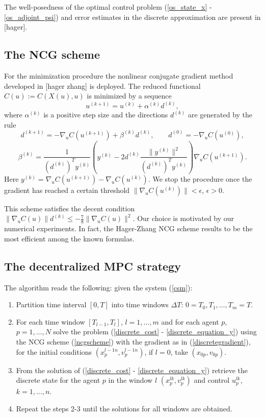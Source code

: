 \documentclass[a4paper,10pt, english]{article}
\begin{document}
 The well-posedness of the optimal control problem (\ref{os_state_x} - \ref{os_adjoint_psi}) and error estimates in the discrete approximation are present in [hager].
 


 \subsection{The NCG scheme}
  For the minimization procedure the nonlinear conjugate gradient  method developed in [hager zhang] is deployed.
  The reduced functional $C(u):=C(X(u), u)$ is minimized by a sequence
  \begin{equation}
  u^{(k+1)} =   u^{(k)} + \alpha^{(k)} d^{(k)},
  \label{ncgscheme}
   \end{equation}  
  where $\alpha^{(k)}$ is a positive step size and the directions $d^{(k)}$ are generated by the rule
  \begin{equation}
  d^{(k+1)} = - \nabla_u C(u^{(k+1)}) + \beta^{(k)} d^{(k)}, \qquad d^{(0)} = -\nabla_u C(u^{(0)}),
  \label{drct}
  \end{equation}
  \begin{equation}
  \beta^{(k)} = \frac{1}{(d^{(k)})^T y^{(k)}} \left( y^{(k)} - 2d^{(k)}\frac{\|y^{(k)}\|^2}{(d^{(k)})^T y^{(k)}}\right)\nabla_u C(u^{(k+1)}).
  \label{drct}
  \end{equation}  
  Here $y^{(k)} = \nabla_u C(u^{(k+1)}) - \nabla_u C(u^{(k)})$. 
  We stop the procedure once the gradient has reached a certain threshold $\|\nabla_u C(u^{(k)})\| < \epsilon$, $\epsilon > 0$.
   
  This scheme satisfies the decent condition $\|\nabla_u C(u)\|d^{(k)} \leq -\frac{7}{8}\|\nabla_u C(u)\|^2$. Our choice is motivated by our numerical experiments. In fact, the Hager-Zhang NCG scheme results to be the most efficient among the known formulas. 
  
  
 
 \subsection{The decentralized MPC strategy}
  The algorithm reads the following: given the system (\ref{csm}):
  
 \begin{enumerate}
   \item Partition time interval $[0, T]$ into time windows $\Delta T$: $0 = T_0, T_1, \dots, T_m = T$.
   \item For each time window  $[T_{l-1}, T_{l}]$, $l = 1, \dots, m$ and for each agent $p$, $p = 1, \dots, N$  solve the problem (\ref{discrete_cost} - \ref{discrete_equation_y}) using the NCG scheme (\ref{ncgscheme}) with the gradient as in (\ref{discretegradient}), for the initial conditions $(x^{l-1n}_p, v^{l-1 n}_p)$, if $l = 0$, take $(x_{0p}, v_{0p})$.
   \item From the solution of (\ref{discrete_cost} - \ref{discrete_equation_y})  retrieve the discrete state for the agent $p$ in the window $l$ $(x^{lk}_p, v^{lk}_p)$ and control $u^{lk}_p$, $k = 1, \dots, n$.
   \item Repeat the steps 2-3 until the solutions for all windows are obtained.
 \end{enumerate}
 
\end{document}
